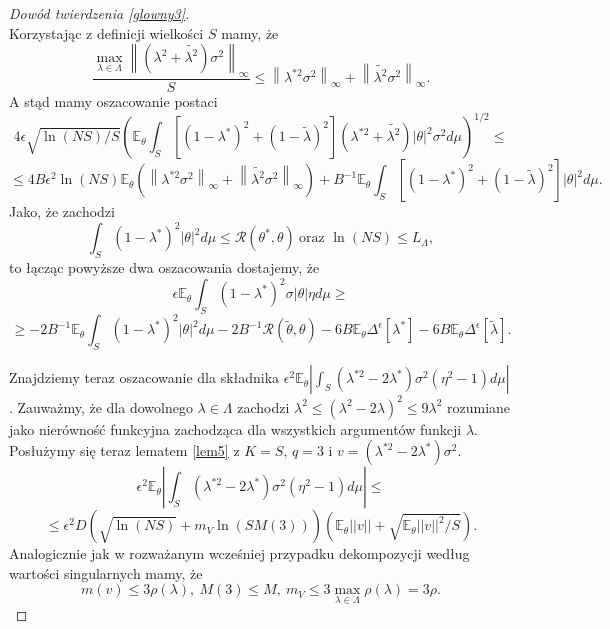 \documentclass{article}
\newcommand{\norm}[1]{\left\lVert#1\right\rVert}
\begin{document}
\begin{proof}[Dowód twierdzenia \ref{glowny3}]
\begin{displaymath}
\end{displaymath}
Korzystając z definicji wielkości $S$ mamy, że
\begin{displaymath}
\frac{\max_{\lambda\in \Lambda}\norm{(\lambda^{2}+\tilde{\lambda^2})\sigma^2}_{\infty}}{S}\leq 
\norm{\lambda^{*2}\sigma^2}_{\infty}+\norm{\tilde{\lambda^2}\sigma^2}_{\infty}.
\end{displaymath}
A stąd mamy oszacowanie postaci
\begin{displaymath}
4\epsilon\sqrt{\ln (NS)/S}\left(\mathbb{E}_{\theta}\int_S[(1-\lambda^*)^2+(1-\tilde{\lambda})^2](\lambda^{*2}+\tilde{\lambda^2})|\theta |^2\sigma^2 d\mu\right)^{1/2}\leq
\end{displaymath}
\begin{displaymath}
\leq 4B\epsilon^2 \ln (NS)\mathbb{E}_{\theta}\left(\norm{\lambda^{*2}\sigma^2}_{\infty}+\norm{\tilde{\lambda^2}\sigma^2}_{\infty}\right)+B^{-1}\mathbb{E}_{\theta}\int_S[(1-\lambda^*)^2+(1-\tilde{\lambda})^2]|\theta |^2d\mu.
\end{displaymath}
Jako, że zachodzi 
\begin{displaymath}
\int_S(1-\lambda^{*})^2|\theta |^2d\mu\leq \mathcal{R}(\theta^*,\theta)\ \textrm{oraz } \ln (NS)\leq L_{\Lambda},
\end{displaymath}
to łącząc powyższe dwa oszacowania dostajemy, że 
\begin{displaymath}
\epsilon\mathbb{E}_{\theta}\int_S(1-\lambda^*)^2\sigma|\theta |\eta d\mu\geq 
\end{displaymath}
\begin{displaymath}
\geq -2B^{-1}\mathbb{E}_{\theta}\int_S(1-\lambda^*)^2|\theta |^2d\mu-2B^{-1}\mathcal{R}(\tilde{\theta},\theta)-6B\mathbb{E}_{\theta}\Delta^{\epsilon}[\lambda^*]-6B\mathbb{E}_{\theta}\Delta^{\epsilon}[\tilde{\lambda}].
\end{displaymath}

Znajdziemy teraz oszacowanie dla składnika $\epsilon^2\mathbb{E}_{\theta}\left|\int_S(\lambda^{*2}-2\lambda^*)\sigma^2(\eta^2-1)d\mu\right|$. Zauważmy, że  dla dowolnego $\lambda\in \Lambda$ zachodzi $\lambda^2\leq (\lambda^2-2\lambda)^2\leq 9\lambda^2$ rozumiane jako nierówność funkcyjna zachodząca dla wszystkich argumentów funkcji $\lambda$. Posłużymy się teraz lematem \ref{lem5} z $K=S$, $q=3$ i $v=(\lambda^{*2}-2\lambda^*)\sigma^2$. 
\begin{displaymath}
\epsilon^2\mathbb{E}_{\theta}\left|\int_S(\lambda^{*2}-2\lambda^*)\sigma^2(\eta^2-1)d\mu\right|\leq
\end{displaymath}
\begin{displaymath}
\leq \epsilon^2D\left(\sqrt{\ln (NS)}+m_V\ln (SM(3))\right)\left(\mathbb{E}_{\theta}||v||+\sqrt{\mathbb{E}_{\theta}||v||^2/S}\right).
\end{displaymath}
Analogicznie jak w rozważanym wcześniej przypadku dekompozycji według wartości singularnych mamy, że
\begin{displaymath}
m(v)\leq 3\rho (\lambda),\ M(3)\leq M,\ m_V\leq 3\max_{\lambda\in \Lambda}\rho(\lambda)=3\rho.
\end{displaymath}


\end{proof}
\end{document}
